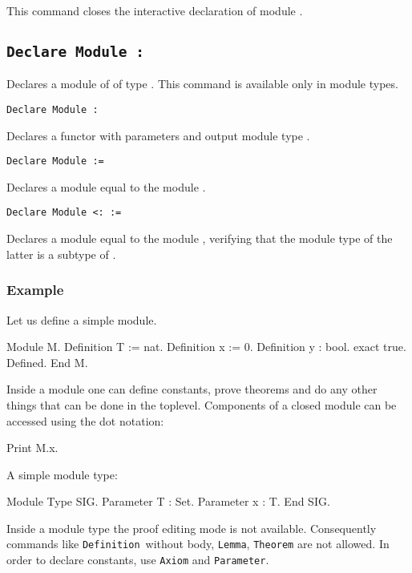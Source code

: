 This command closes the interactive declaration of module {\ident}.

\subsection{\tt Declare Module {\ident} : {\modtype}}

Declares a module of {\ident} of type {\modtype}. This command is available
only in module types. 

\begin{Variants}

\item{\tt Declare Module {\ident} {\modbindings} \verb.:. {\modtype}}

  Declares a functor with parameters {\modbindings} and output module
  type {\modtype}.

\item{\tt Declare Module {\ident} := {\qualid}}

  Declares a module equal to the module {\qualid}.

\item{\tt Declare Module {\ident} \verb.<:. {\modtype} := {\qualid}}

  Declares a module equal to the module {\qualid}, verifying that the
  module type of the latter is a subtype of {\modtype}.

\end{Variants}


\subsubsection{Example}

Let us define a simple module.
\begin{coq_example}
Module M.
  Definition T := nat.
  Definition x := 0.
  Definition y : bool.
    exact true.
  Defined.
End M.
\end{coq_example}
Inside a module one can define constants, prove theorems and do any
other things that can be done in the toplevel. Components of a closed
module can be accessed using the dot notation:
\begin{coq_example}
Print M.x.
\end{coq_example}
A simple module type:
\begin{coq_example}
Module Type SIG.
  Parameter T : Set.
  Parameter x : T.
End SIG.
\end{coq_example}
Inside a module type the proof editing mode is not available.
Consequently commands like \texttt{Definition}\ without body,
\texttt{Lemma}, \texttt{Theorem} are not allowed.  In order to declare
constants, use \texttt{Axiom} and \texttt{Parameter}.

